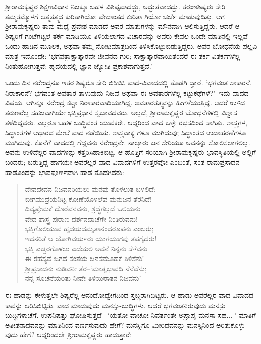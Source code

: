 ಶ್ರೀರಾಮಕೃಷ್ಣರ ಶಿಕ್ಷಣವಿಧಾನ ನಿಜಕ್ಕೂ ಬಹಳ ವಿಶಿಷ್ಟವಾದದ್ದು, ಅದ್ಭುತವಾದದ್ದು. ತರುಣಶಿಷ್ಯರು ಸೇರಿ ತಮ್ಮತಮ್ಮೊಳಗೆ ಆತ್ಮತತ್ತ್ವದ ಕುರಿತಾಗಿಯೋ ವೇದಾಂತದ ಕುರಿತಾ ಗಿಯೋ ಚರ್ಚೆ ಮಾಡುವುದಿತ್ತು. ಆಗ ಶ್ರೀರಾಮಕೃಷ್ಣರು ತಾವು ಮಧ್ಯೆ ಪ್ರವೇಶ ಮಾಡದೆ ಅವರ ಮಾತುಗಳನ್ನು ಮೌನವಾಗಿ ಆಲಿಸುತ್ತಿದ್ದರು. ಆದರೆ ಆ ಶಿಷ್ಯರಿಗೆ ಗಂಟೆಗಟ್ಟಲೆ ತರ್ಕ ಮಾಡಿಯೂ ತಿಳಿಯಲಾಗದ ವಿಚಾರವನ್ನು ಅವರು ಕೇವಲ ಒಂದೇ ಮಾತಿನಲ್ಲಿ ಇಲ್ಲವೆ ಒಂದು ಹಾಡಿನ ಮೂಲಕ, ಅಥವಾ ತಮ್ಮ ನೋಟಮಾತ್ರದಿಂದ ತಿಳಿಸಿಕೊಟ್ಟುಬಿಡುತ್ತಿದ್ದರು. ಅವರ ಬೋಧನೆಯ ಪಲ್ಲವಿ ಮಾತ್ರ ಇದೊಂದೇ: ‘ಭಗವತ್ಸಾಕ್ಷಾತ್ಕಾರವೇ ಜೀವನದ ಗುರಿ; ಸಾಕ್ಷಾತ್ಕಾರವಾಯಿತೆಂದರೆ ಈ ತರ್ಕ-ವಿತರ್ಕಗಳೆಲ್ಲ ನಿಂತುಹೋಗುತ್ತವೆ; ಹೃದಯದಲ್ಲಿ ಜ್ಞಾನ ಜ್ಯೋತಿ ಪ್ರಕಾಶವಾಗುತ್ತದೆ.’

ಒಂದು ದಿನ ನರೇಂದ್ರನೂ ಇತರ ಶಿಷ್ಯರೂ ಸೇರಿ ಬಿಸಿಬಿಸಿ ವಾದ-ವಿವಾದದಲ್ಲಿ ತೊಡಗಿ ದ್ದಾರೆ. ‘ಭಗವಂತ ಸಾಕಾರನೆ, ನಿರಾಕಾರನೆ? ಭಗವಂತ ಅವತಾರ ತಾಳುವುದು ನಿಜವೆ ಅಥವಾ ಈ ಅವತಾರಗಳೆಲ್ಲ ಕಟ್ಟುಕಥೆಗಳೆ?’–ಇದು ವಾದದ ವಿಷಯ. ಆಗಿನ್ನೂ ನರೇಂದ್ರ ಕಟ್ಟಾ ನಿರಾಕಾರವಾದಿಯಾಗಿದ್ದ. ಅವತಾರತತ್ತ್ವವನ್ನು ಹೀಗಳೆಯುತ್ತಿದ್ದ. ಆದರೆ ಉಳಿದ ತರುಣರೆಲ್ಲ ಸಹಜವಾಗಿಯೇ ಭಕ್ತಿಪ್ರಧಾನ ಸ್ವಭಾವದವರು. ಅಲ್ಲದೆ, ಶ್ರೀರಾಮಕೃಷ್ಣರ ಬೋಧನೆಗಳಲ್ಲಿ ವಿಶ್ವಾಸ ತಳೆದಿದ್ದವರು. ಎಲ್ಲರೂ ಬಹಳ ಬುದ್ಧಿವಂತ ಯುವಕರೇ. ಆದ್ದರಿಂದ ವಾದ ಒಳ್ಳೇ ರಭಸದಿಂದ ಸಾಗಿತ್ತು. ಶಾಸ್ತ್ರಗಳ, ಸಿದ್ಧಾಂತಗಳ ಆಧಾರದ ಮೇಲೆ ವಾದ ನಡೆಯಿತು. ಶಾಸ್ತ್ರವಾಕ್ಯ ಗಳೂ ಮುಗಿದುವು; ಸಿದ್ಧಾಂತದ ಉದಾಹರಣೆಗಳೂ ಮುಗಿದುವು. ಕೊನೆಗೆ ವಾದದಲ್ಲಿ ಗೆದ್ದವನು ನರೇಂದ್ರನೇ. ನಾಲ್ಕಾರು ಜನ ಸೇರಿಯೂ ಅವನನ್ನು ಸೋಲಿಸಲಾಗಲಿಲ್ಲ. ಅವನು ಉಳಿದೆಲ್ಲರ ವಾದಗಳನ್ನು ಕತ್ತರಿಸಿಹಾಕಿಬಿಟ್ಟ. ಆ ಹೊತ್ತಿಗೆ ಸರಿಯಾಗಿ ಶ್ರೀರಾಮಕೃಷ್ಣರು ಭಾವಸ್ಥಿತಿಯಲ್ಲಿ ಅಲ್ಲಿಗೆ ಬಂದರು; ಬರುತ್ತಿದ್ದ ಹಾಗೆಯೇ ಅವರೆಲ್ಲರ ವಾದ-ವಿವಾದಗಳಿಗೆ ಉತ್ತರವೋ ಎಂಬಂತೆ, ಸಂತ ರಾಮಪ್ರಸಾದನ ಹಾಡೊಂದನ್ನು ಭಾವಪೂರ್ಣವಾಗಿ ಹಾಡ ತೊಡಗಿದರು:

\begin{verse}
 ದೇವದೇವನ ನಿಜವನರಿಯಲು ಮನವು ತೊಳಲುತ ಬಳಲಿದೆ;\\
 ಬೀಗಮುದ್ರೆಯನಿಟ್ಟ ಕೋಣೆಯೊಳಲೆವ ಮನುಜನ ತೆರನಿದೆ!\\
 ದಿವ್ಯಪ್ರೇಮಕೆ ದೊರೆವನವನು, ಶ್ರದ್ಧೆಗಲ್ಲದೆ ಒಲಿಯನು\\
 ವೇದ-ಶಾಸ್ತ್ರ-ಪುರಾಣ-ದರ್ಶನದಾಚೆಗೇ ನಿಂತಿರುವನು!\\
 ಭಕ್ತಿಗೊಲಿಯುವ ಹೃದಯದಮೃತಾನಂದರೂಪನು ಎಂಬರು;\\
 ಇದನರಿತೆ ಆ ಯೋಗಿವರ್ಯರು ಯುಗಯುಗವು ತಪಗೈದರು!\\
 ಭಕ್ತಿ ಎಚ್ಚರಗೊಳಲು ಎದೆಯಲಿ ಅವನೆ ನಿನ್ನನು ಸೆಳೆವನು\\
 ಈ ರಹಸ್ಯವ ಜಗದ ಸಂತೆಯ ಜನಸಮೂಹಕೆ ತಿಳಿಸೆನು!\\
 ಶ್ರೀಪ್ರಸಾದನು ನುಡಿವನೀ ತೆರ–‘ಮಾತೃಭಾವದಿ ನೆನೆವೆನು;\\
 ನನ್ನ ಸೂಚನೆಯರಿತು ನೀವೇ ತಿಳಿಯಿರಾತನ ನಿಜವನು’
\end{verse}

ಈ ಹಾಡನ್ನು ಕೇಳುತ್ತಲೇ ಶಿಷ್ಯರೆಲ್ಲ ಆನಂದೋದ್ವೇಗದಿಂದ ಸ್ತಬ್ಧರಾಗಿಬಿಟ್ಟರು. ಆ ಹಾಡು ಅವರೆಲ್ಲರ ವಾದ ವಿವಾದದ ಕಾವನ್ನು ಆರಿಸಿಬಿಟ್ಟಿತು. ವಾದ ಮಾಡುವುದು ಮನಸ್ಸು-ಬುದ್ಧಿಗಳು. ಆದರೆ ಭಗವಂತನಿರುವುದು ಮನಸ್ಸು ಬುದ್ಧಿಗಳಾಚೆಗೆ. ಉಪನಿಷತ್ತು ಘೋಷಿಸುತ್ತದೆ– ‘ಯತೋ ವಾಚೋ ನಿವರ್ತಂತೇ ಅಪ್ರಾಪ್ಯ ಮನಸಾ ಸಹ... ’ ಮಾತಿಗೆ ಅತೀತನಾದವನನ್ನು ಮಾತಿನಿಂದ ವರ್ಣಿಸುವುದು ಹೇಗೆ? ಮನಸ್ಸಿಗೂ ಮೀರಿದವನನ್ನು ಮನಸ್ಸಿನಿಂದ ಅರಿತುಕೊಳ್ಳು ವುದು ಹೇಗೆ? ಆದ್ದರಿಂದಲೇ ಶ್ರೀರಾಮಕೃಷ್ಣರು ಹಾಡುತ್ತಾರೆ:

